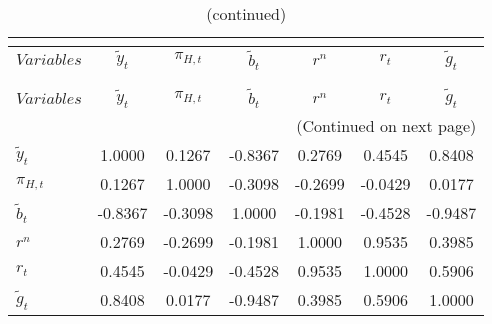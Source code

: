  
\begin{center}
\begin{longtable}{lcccccc} 
\caption{MATRIX OF CORRELATIONS}\\
 \label{Table:th_corr_matrix}\\
\toprule 
$Variables        $	 & 	 $   {\tilde{y}_{t}}$	 & 	 $       {\pi_{H,t}}$	 & 	 $     \tilde{b}_{t}$	 & 	 $            {r^{n}}$	 & 	 $            {r_{t}}$	 & 	 $     \tilde{g}_{t}$\\
\midrule \endfirsthead 
\caption{(continued)}\\
 \toprule \\ 
$Variables        $	 & 	 $   {\tilde{y}_{t}}$	 & 	 $       {\pi_{H,t}}$	 & 	 $     \tilde{b}_{t}$	 & 	 $            {r^{n}}$	 & 	 $            {r_{t}}$	 & 	 $     \tilde{g}_{t}$\\
\midrule \endhead 
\midrule \multicolumn{7}{r}{(Continued on next page)} \\ \bottomrule \endfoot 
\bottomrule \endlastfoot 
${\tilde{y}_{t}}  $	 & 	             1.0000	 & 	             0.1267	 & 	            -0.8367	 & 	             0.2769	 & 	             0.4545	 & 	             0.8408 \\ 
${\pi_{H,t}}      $	 & 	             0.1267	 & 	             1.0000	 & 	            -0.3098	 & 	            -0.2699	 & 	            -0.0429	 & 	             0.0177 \\ 
$\tilde{b}_{t}    $	 & 	            -0.8367	 & 	            -0.3098	 & 	             1.0000	 & 	            -0.1981	 & 	            -0.4528	 & 	            -0.9487 \\ 
${r^{n}}          $	 & 	             0.2769	 & 	            -0.2699	 & 	            -0.1981	 & 	             1.0000	 & 	             0.9535	 & 	             0.3985 \\ 
${r_{t}}          $	 & 	             0.4545	 & 	            -0.0429	 & 	            -0.4528	 & 	             0.9535	 & 	             1.0000	 & 	             0.5906 \\ 
$\tilde{g}_{t}    $	 & 	             0.8408	 & 	             0.0177	 & 	            -0.9487	 & 	             0.3985	 & 	             0.5906	 & 	             1.0000 \\ 
\end{longtable}
 \end{center}
